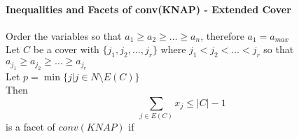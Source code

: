             \paragraph{Inequalities and Facets of conv(KNAP) - Extended Cover}
                Order the variables so that $a_1 \ge a_2 \ge \dots \ge a_n$, therefore $a_1 = a_{max}$\\
                Let $C$ be a cover with $\{j_1, j_2, \dots, j_r\}$ where $j_1 < j_2 < \dots < j_r$ so that $a_{j_1} \ge a_{j_2} \ge \dots \ge a_{j_r}$\\
                Let $p = \min\{j | j\in N \setminus E(C)\}$\\
                Then
                \begin{equation*}
                    \sum_{j\in E(C)} x_j \le |C| - 1 
                \end{equation*}
                is a facet of $conv(KNAP)$ if
